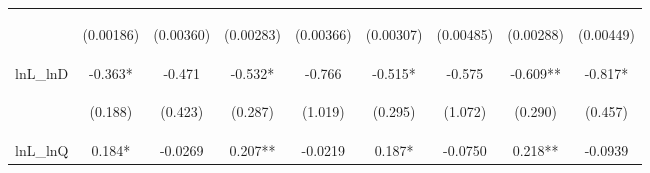 \documentclass[]{article}
\begin{document}
\begin{center}
\begin{tabular}{lcccccccc}
\vspace{4pt} & \begin{footnotesize}(0.00186)\end{footnotesize} & \begin{footnotesize}(0.00360)\end{footnotesize} & \begin{footnotesize}(0.00283)\end{footnotesize} & \begin{footnotesize}(0.00366)\end{footnotesize} & \begin{footnotesize}(0.00307)\end{footnotesize} & \begin{footnotesize}(0.00485)\end{footnotesize} & \begin{footnotesize}(0.00288)\end{footnotesize} & \begin{footnotesize}(0.00449)\end{footnotesize} \\
lnL\_lnD & -0.363* & -0.471 & -0.532* & -0.766 & -0.515* & -0.575 & -0.609** & -0.817* \\
\vspace{4pt} & \begin{footnotesize}(0.188)\end{footnotesize} & \begin{footnotesize}(0.423)\end{footnotesize} & \begin{footnotesize}(0.287)\end{footnotesize} & \begin{footnotesize}(1.019)\end{footnotesize} & \begin{footnotesize}(0.295)\end{footnotesize} & \begin{footnotesize}(1.072)\end{footnotesize} & \begin{footnotesize}(0.290)\end{footnotesize} & \begin{footnotesize}(0.457)\end{footnotesize} \\
lnL\_lnQ & 0.184* & -0.0269 & 0.207** & -0.0219 & 0.187* & -0.0750 & 0.218** & -0.0939 \\

\end{tabular}
\end{center}
\end{document}
